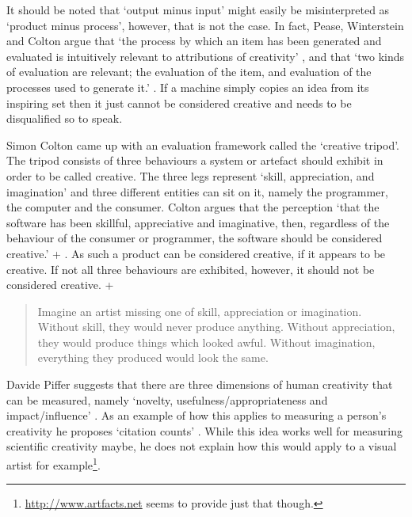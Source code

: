 It should be noted that `output minus input' might easily be misinterpreted as `product minus process', however, that is not the case. In fact, Pease, Winterstein and Colton argue that `the process by which an item has been generated and evaluated is intuitively relevant to attributions of creativity' \citeyear[p.6]{Pease2001}, and that `two kinds of evaluation are relevant; the evaluation of the item, and evaluation of the processes used to generate it.' \citeyear[p.7]{Pease2001}. If a machine simply copies an idea from its inspiring set then it just cannot be considered creative and needs to be disqualified so to speak.

Simon Colton came up with an evaluation framework called the `creative tripod'. The tripod consists of three behaviours a system or artefact should exhibit in order to be called creative. The three legs represent `skill, appreciation, and imagination' and three different entities can sit on it, namely the programmer, the computer and the consumer. Colton argues that the perception `that the software has been skillful, appreciative and imaginative, then, regardless of the behaviour of the consumer or programmer, the software should be considered creative.' \citeyear[p.5]{Colton2008a} + \citeyear[p.5]{Colton2008}. As such a product can be considered creative, if it appears to be creative. If not all three behaviours are exhibited, however, it should not be considered creative. \autocite[p.5]{Colton2008a} + \autocite[p.5]{Colton2008}

\begin{quotation}
  Imagine an artist missing one of skill, appreciation or imagination. Without skill, they would never produce anything. Without appreciation, they would produce things which looked awful. Without imagination, everything they produced would look the same. 
\end{quotation}

Davide Piffer suggests that there are three dimensions of human creativity that can be measured, namely `novelty, usefulness/appropriateness and impact/influence' \citeyear[p.258-259]{Piffer2012}. As an example of how this applies to measuring a person's creativity he proposes `citation counts' \autocite[p.261]{Piffer2012}. While this idea works well for measuring scientific creativity maybe, he does not explain how this would apply to a visual artist for example\footnote{\url{http://www.artfacts.net} seems to provide just that though.}.

\spirals

